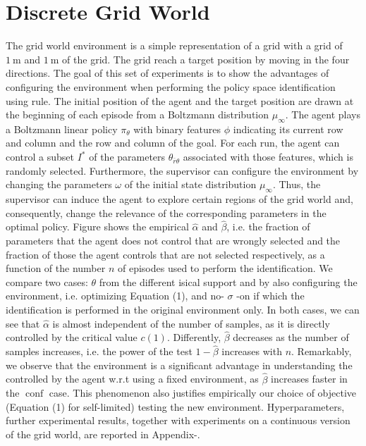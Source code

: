 \documentclass{article}
\begin{document}
{\section*{Discrete Grid World}
The grid world environment is a simple representation of a grid with a grid of \(1 \mathrm{~m}\) and \(1 \mathrm{~m}\) of the grid. The grid reach a target position by moving in the four directions. The goal of this set of experiments is to show the advantages of configuring the environment when performing the policy space identification using rule. The initial position of the agent and the target position are drawn at the beginning of each episode from a Boltzmann distribution \(\mu_{\infty}\). The agent plays a Boltzmann linear policy \(\pi_{\theta}\) with binary features \(\phi\) indicating its current row and column and the row and column of the goal. For each run, the agent can control a subset \(I^{*}\) of the parameters \(\theta_{\bar{r} \theta}\) associated with those features, which is randomly selected. Furthermore, the supervisor can configure the environment by changing the parameters \(\omega\) of the initial state distribution \(\mu_{\infty}\). Thus, the supervisor can induce the agent to explore certain regions of the grid world and, consequently, change the relevance of the corresponding parameters in the optimal policy.
Figure shows the empirical \(\hat{\alpha}\) and \(\hat{\beta}\), i.e. the fraction of parameters that the agent does not control that are wrongly selected and the fraction of those the agent controls that are not selected respectively, as a function of the number \(n\) of episodes used to perform the identification. We compare two cases: \(\theta\) from the different isical support and by also configuring the environment, i.e. optimizing Equation (1), and no- \(\sigma\) -on if which the identification is performed in the original environment only. In both cases, we can see that \(\hat{\alpha}\) is almost independent of the number of samples, as it is directly controlled by the critical value \(c(1)\). Differently, \(\hat{\beta}\) decreases as the number of samples increases, i.e. the power of the test \(1-\hat{\beta}\) increases with \(n\). Remarkably, we observe that the environment is a significant advantage in understanding the controlled by the agent w.r.t using a fixed environment, as \(\hat{\beta}\) increases faster in the \(\operatorname{conf}\) case. This phenomenon also justifies empirically our choice of objective (Equation (1) for self-limited) testing the new environment. Hyperparameters, further experimental results, together with experiments on a continuous version of the grid world, are reported in Appendix-.
}
\end{document}
